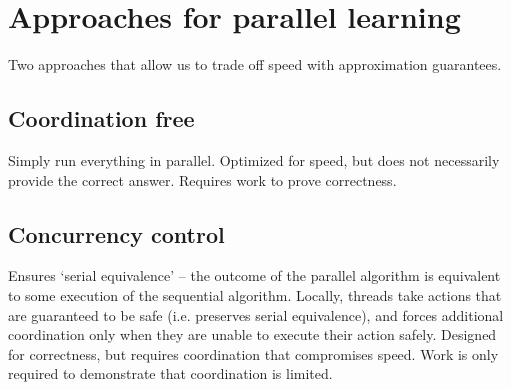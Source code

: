 \documentclass{article} %
\begin{document}
\section{Approaches for parallel learning}

Two approaches that allow us to trade off speed with approximation guarantees.

\subsection{Coordination free}
Simply run everything in parallel.
Optimized for speed, but does not necessarily provide the correct answer.
Requires work to prove correctness.

\subsection{Concurrency control}
Ensures `serial equivalence' -- the outcome of the parallel algorithm is equivalent to some execution of the sequential algorithm.
Locally, threads take actions that are guaranteed to be safe (i.e. preserves serial equivalence), and forces additional coordination only when they are unable to execute their action safely.
Designed for correctness, but requires coordination that compromises speed.
Work is only required to demonstrate that coordination is limited.
\end{document}
